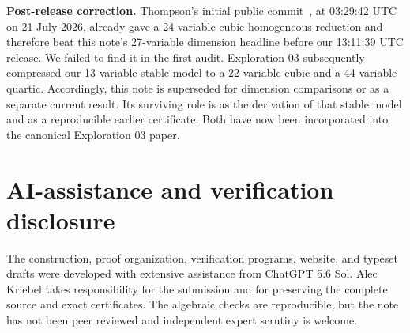 \documentclass[11pt]{article}
\begin{document}
\textbf{Post-release correction.} Thompson's initial public
commit~\cite{thompson}, at 03:29:42 UTC on 21 July 2026, already gave a
24-variable cubic homogeneous reduction and therefore beat this note's
27-variable dimension headline before our 13:11:39 UTC release. We failed to
find it in the first audit. Exploration 03 subsequently compressed our
13-variable stable model to a 22-variable cubic and a 44-variable quartic.
Accordingly, this note is superseded for dimension comparisons or as a
separate current result. Its surviving role is as the derivation of that
stable model and as a reproducible earlier certificate. Both have now been
incorporated into the canonical Exploration 03 paper.

\section*{AI-assistance and verification disclosure}

The construction, proof organization, verification programs, website, and
typeset drafts were developed with extensive assistance from ChatGPT 5.6 Sol.
Alec Kriebel takes responsibility for the submission and for preserving the
complete source and exact certificates.  The algebraic checks are reproducible,
but the note has not been peer reviewed and independent expert scrutiny is
welcome.
\end{document}
